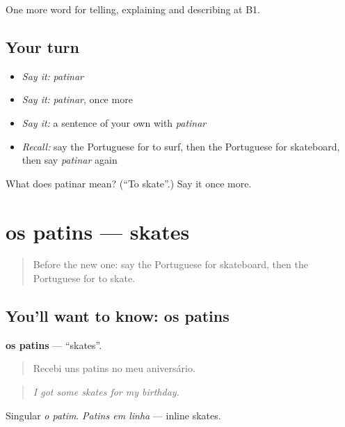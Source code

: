 \begin{grammarlens}[title={What you've built}]
One more word for telling, explaining and describing at B1.
\end{grammarlens}

\subsection*{Your turn}
\begin{itemize}
\raggedright
  \item \emph{Say it:} \emph{patinar}
  \item \emph{Say it:} \emph{patinar}, once more
  \item \emph{Say it:} a sentence of your own with \emph{patinar}
  \item \emph{Recall:} say the Portuguese for to surf, then the Portuguese for skateboard, then say \emph{patinar} again
\end{itemize}

\begin{tcolorbox}[breakable,colback=teal!4,colframe=teal!35!black,title={Before you move on}]
What does patinar mean? (\textquotedblleft{}To skate\textquotedblright{}.) Say it once more.
\end{tcolorbox}
\section[os patins]{os patins — skates}

\label{lesson:PT-C507-patins}



\begin{quote}
Before the new one: say the Portuguese for skateboard, then the Portuguese for to skate.
\end{quote}

\subsection*{You'll want to know: os patins}
\textbf{os patins} — \textquotedblleft{}skates\textquotedblright{}.

\begin{quote}
Recebi uns patins no meu aniversário.
\end{quote}

\begin{quote}
\emph{I got some skates for my birthday.}
\end{quote}

Singular \emph{o patim}. \emph{Patins em linha} — inline skates.

